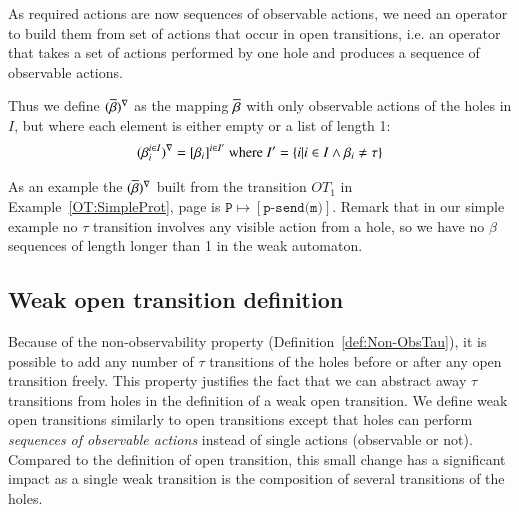 \documentclass{elsarticle}
\newcommand{\TODO}[1]{\textcolor{red}{\textbf{[TODO:#1]}}}
\newcommand{\RAB}[1]{\textcolor{magenta}{#1}}
\begin{document}
As required actions are now sequences of observable actions, we need an operator to build them from set of actions that occur in open transitions, i.e. an operator that takes a set of actions performed by one hole and produces a sequence of observable actions.

Thus we define $(\overline{\beta})^{\nabla}$ as the mapping $\overline{\beta}$  with only observable actions of the holes in $I$, but where each element is either empty or a list of length 1:
 \[(\beta_i^{i\in I})^{\nabla} = [\beta_i]^{i\in I'}\text{ where }I'=\left\{i| i\in I \land \beta_i\neq \tau\right\}\]

As an example the $(\overline{\beta})^{\nabla}$ built from the transition $OT_1$ in Example~\ref{OT:SimpleProt}, page \pageref{OT:SimpleProt} is $\texttt{P}\mapsto [\texttt{p-send(m)}]$. Remark that in our simple example no $\tau$ transition involves any visible action from a hole, so we have no $\beta$ sequences of length longer than 1 in the weak automaton.

\subsection{Weak open transition definition}

Because of the non-observability property (Definition~\ref{def:Non-ObsTau}), it is possible to add any number of $\tau$ transitions of the holes before or after any open transition freely. This property justifies the fact that we can abstract away $\tau$ transitions from holes in the definition of a weak open transition.
We define weak open transitions similarly to open transitions except that holes can perform \emph{sequences of observable actions} instead of single actions (observable or not). Compared to the definition of open transition, this small change has a significant impact as a single weak transition is the composition of several transitions of the holes.



%

\def\InvAct{\mathcal{Inv}}
%
\end{document}
